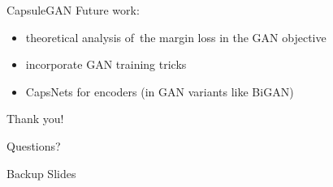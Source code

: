\documentclass{beamer}
\begin{document}
{\begin{frame}{CapsuleGAN}
      Future work:
      \pause
      \begin{itemize}[<+- | alert@+>]
        \item theoretical analysis of~the margin loss in the GAN objective
        \item incorporate GAN training tricks
        \item CapsNets for encoders (in GAN variants like BiGAN)
      \end{itemize}
      \pause
    \end{frame}
  }


  \begin{frame}[standout]
    \begin{center}
      Thank you!

      Questions?
    \end{center}
  \end{frame}


  \appendix
  \begin{frame}[standout]
    Backup Slides
  \end{frame}
\end{document}
